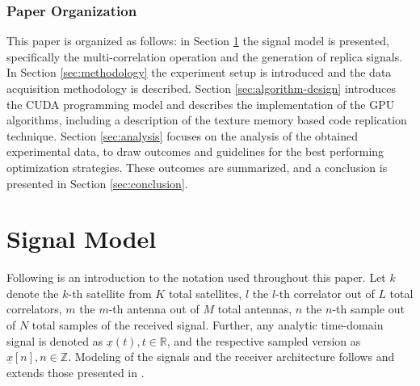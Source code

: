 \documentclass{juliacon}
\begin{document}
\subsubsection*{Paper Organization}This paper is organized as follows: in Section \ref{sec:signal-model} the signal model is presented, specifically the multi-correlation operation and the generation of replica signals. In Section \ref{sec:methodology} the experiment setup is introduced and the data acquisition methodology is described. Section \ref{sec:algorithm-design} introduces the CUDA programming model and describes the implementation of the GPU algorithms, including a description of the texture memory based code replication technique. Section \ref{sec:analysis} focuses on the analysis of the obtained experimental data, to draw outcomes and guidelines for the best performing optimization strategies. These outcomes are summarized, and a conclusion is presented in Section \ref{sec:conclusion}.

\section{Signal Model}\label{sec:signal-model}

Following is an introduction to the notation used throughout this paper. Let $k$ denote the $k$-th satellite from $K$ total satellites, $l$ the $l$-th correlator out of $L$ total correlators, $m$ the $m$-th antenna out of $M$ total antennas, $n$ the $n$-th sample out of $N$ total samples of the received signal. Further, any analytic time-domain signal is denoted as $\underline{x}(t), t \in \mathbb{R}$, and the respective sampled version as $\underline{x}[n], n \in \mathbb{Z}$. Modeling of the signals and the receiver architecture follows and extends those presented in \cite{Borre2007, Teunissen2017}.
\end{document}
